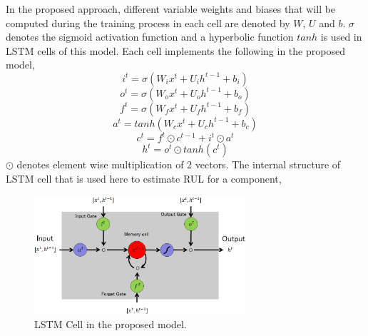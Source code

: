 In the proposed approach, different variable weights and biases that will be computed during the training process in each cell are denoted by $W$, $U$ and $b$. $\sigma$ denotes the sigmoid activation function and a hyperbolic function $tanh$ is used in LSTM cells of this model. Each cell implements the following in the proposed model,
\begin{equation}
    i^t = \sigma(W_ix^t + U_ih^{t-1} + b_i)
\end{equation}
\begin{equation}
    o^t = \sigma(W_ox^t + U_oh^{t-1} + b_o)
\end{equation}
\begin{equation}
    f^t = \sigma(W_fx^t + U_fh^{t-1} + b_f)
\end{equation}
\begin{equation}
    a^t = tanh(W_cx^t + U_ch^{t-1} + b_c)
\end{equation}
\begin{equation}
    c^t = f^t \odot c^{t-1} + i^t \odot a^t
\end{equation}
\begin{equation}
    h^t = o^t \odot tanh(c^t)
\end{equation}
$\odot$ denotes element wise multiplication of 2 vectors. The internal structure of LSTM cell that is used here to estimate RUL for a component,
\begin{figure}[ht]
    \centering
    \includegraphics[width=0.7\textwidth]{gfx/rul_lstm2}
    \caption{LSTM Cell in the proposed model. \cite{DBLP:conf/icphm/ZhengRFG17} }
    \label{fig:lstm2_rul}
\end{figure}

